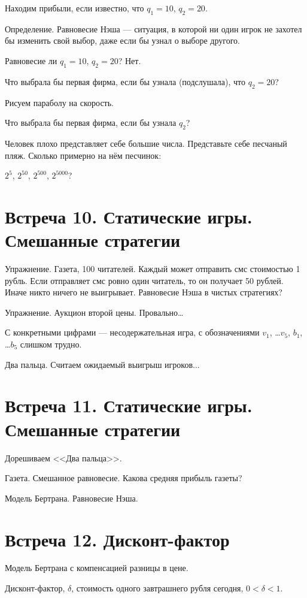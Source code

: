 \documentclass[pdftex,12pt,a4paper]{article}
\begin{document}
Находим прибыли, если известно, что $q_1=10$, $q_2=20$.


Определение. Равновесие Нэша --- ситуация, в которой ни один игрок не захотел бы изменить свой выбор, даже если бы узнал о выборе другого. 


Равновесие ли $q_1=10$, $q_2=20$? Нет.


Что выбрала бы первая фирма, если бы узнала (подслушала), что $q_2=20$?


Рисуем параболу на скорость. 


Что выбрала бы первая фирма, если бы узнала $q_2$?


Человек плохо представляет себе большие числа. Представьте себе песчаный пляж. Сколько примерно на нём песчинок:


$2^5$, $2^{50}$, $2^{500}$, $2^{5000}$?


\section{Встреча 10. Статические игры. Смешанные стратегии}


Упражнение. Газета, 100 читателей. Каждый может отправить смс стоимостью 1 рубль. Если отправляет смс ровно один читатель, то он получает 50 рублей. Иначе никто ничего не выигрывает. Равновесие Нэша в чистых стратегиях?


Упражнение. Аукцион второй цены. Провально\ldots


С конкретными цифрами --- несодержательная игра, с обозначениями $v_1$, \ldots $v_5$, $b_1$, \ldots $b_5$ слишком трудно. 


Два пальца. Считаем ожидаемый выигрыш игроков...


\section{Встреча 11. Статические игры. Смешанные стратегии}


Дорешиваем <<Два пальца>>.


Газета. Смешанное равновесие. Какова средняя прибыль газеты?


Модель Бертрана. Равновесие Нэша.


\section{Встреча 12. Дисконт-фактор}

Модель Бертрана с компенсацией разницы в цене.


Дисконт-фактор, $\delta$, стоимость одного завтрашнего рубля сегодня, $0<\delta<1$.
\end{document}

